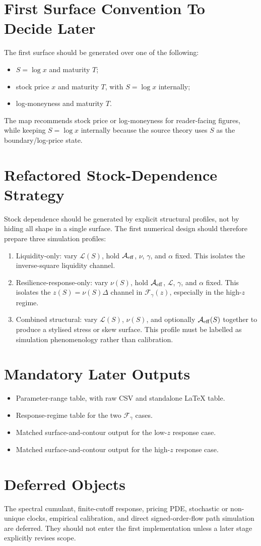 \documentclass[11pt]{article}
\begin{document}
\section*{First Surface Convention To Decide Later}
The first surface should be generated over one of the following:
\begin{itemize}
  \item \(S=\log x\) and maturity \(T\);
  \item stock price \(x\) and maturity \(T\), with \(S=\log x\) internally;
  \item log-moneyness and maturity \(T\).
\end{itemize}
The map recommends stock price or log-moneyness for reader-facing figures,
while keeping \(S=\log x\) internally because the source theory uses \(S\)
as the boundary/log-price state.

\section*{Refactored Stock-Dependence Strategy}
Stock dependence should be generated by explicit structural profiles, not
by hiding all shape in a single surface. The first numerical design should
therefore prepare three simulation profiles:
\begin{enumerate}
  \item Liquidity-only: vary \(\mathcal L(S)\), hold
  \(\mathcal A_{\rm eff}\), \(\nu\), \(\gamma\), and \(\alpha\) fixed.
  This isolates the inverse-square liquidity channel.
  \item Resilience-response-only: vary \(\nu(S)\), hold
  \(\mathcal A_{\rm eff}\), \(\mathcal L\), \(\gamma\), and \(\alpha\)
  fixed. This isolates the \(z(S)=\nu(S)\Delta\) channel in
  \(\mathcal F_\gamma(z)\), especially in the high-\(z\) regime.
  \item Combined structural: vary \(\mathcal L(S)\), \(\nu(S)\), and
  optionally \(\mathcal A_{\rm eff}(S)\) together to produce a stylised
  stress or skew surface. This profile must be labelled as simulation
  phenomenology rather than calibration.
\end{enumerate}

\section*{Mandatory Later Outputs}
\begin{itemize}
  \item Parameter-range table, with raw CSV and standalone LaTeX table.
  \item Response-regime table for the two \(\mathcal F_\gamma\) cases.
  \item Matched surface-and-contour output for the low-\(z\) response case.
  \item Matched surface-and-contour output for the high-\(z\) response case.
\end{itemize}

\section*{Deferred Objects}
The spectral cumulant, finite-cutoff response, pricing PDE, stochastic or
non-unique clocks, empirical calibration, and direct signed-order-flow path
simulation are deferred. They should not enter the first implementation
unless a later stage explicitly revises scope.
\end{document}
